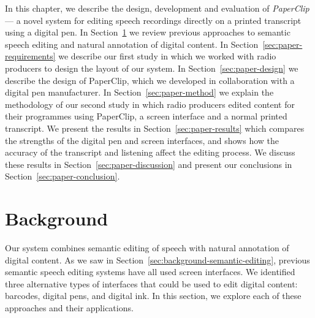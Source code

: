 
In this chapter, we describe the design, development and evaluation of \textit{PaperClip} --- a novel system for editing
speech recordings directly on a printed transcript using a digital pen.  In Section~\ref{sec:paper-background} we
review previous approaches to semantic speech editing and natural annotation of digital content. In
Section~\ref{sec:paper-requirements} we describe our first study in which we worked with radio producers to design the
layout of our system. In Section~\ref{sec:paper-design} we describe the design of PaperClip, which we developed in
collaboration with a digital pen manufacturer. In Section~\ref{sec:paper-method} we explain the methodology of our
second study in which radio producers edited content for their programmes using PaperClip, a screen interface and a
normal printed transcript.  We present the results in Section~\ref{sec:paper-results} which compares the strengths of
the digital pen and screen interfaces, and shows how the accuracy of the transcript and listening affect the editing
process.  We discuss these results in Section~\ref{sec:paper-discussion} and present our conclusions in
Section~\ref{sec:paper-conclusion}.


\section{Background}\label{sec:paper-background}


Our system combines semantic editing of speech with natural annotation of digital content. As we saw in
Section~\ref{sec:background-semantic-editing}, previous semantic speech editing systems have all used screen
interfaces. We identified three alternative types of interfaces that could be used to edit digital content:
barcodes,
digital pens,
and digital ink.
In this section, we explore each of these approaches and their applications.

